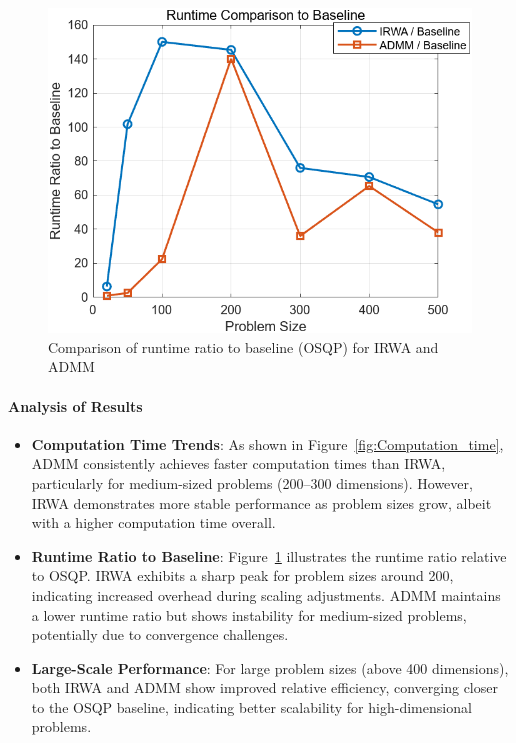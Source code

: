 \documentclass{article}
\begin{document}
\begin{figure}[H]
    \centering
    \includegraphics[width=0.75\linewidth]{fig/Computation_time_baseline.png}
    \caption{Comparison of runtime ratio to baseline (OSQP) for IRWA and ADMM}
    \label{fig:Computation_time_baseline}
\end{figure}

\paragraph{Analysis of Results}

\begin{itemize}
    \item \textbf{Computation Time Trends}:
    As shown in Figure~\ref{fig:Computation_time}, ADMM consistently achieves faster computation times than IRWA, particularly for medium-sized problems (200–300 dimensions). However, IRWA demonstrates more stable performance as problem sizes grow, albeit with a higher computation time overall.

    \item \textbf{Runtime Ratio to Baseline}:
    Figure~\ref{fig:Computation_time_baseline} illustrates the runtime ratio relative to OSQP. IRWA exhibits a sharp peak for problem sizes around 200, indicating increased overhead during scaling adjustments. ADMM maintains a lower runtime ratio but shows instability for medium-sized problems, potentially due to convergence challenges.

    \item \textbf{Large-Scale Performance}:
    For large problem sizes (above 400 dimensions), both IRWA and ADMM show improved relative efficiency, converging closer to the OSQP baseline, indicating better scalability for high-dimensional problems.
\end{itemize}
\end{document}

